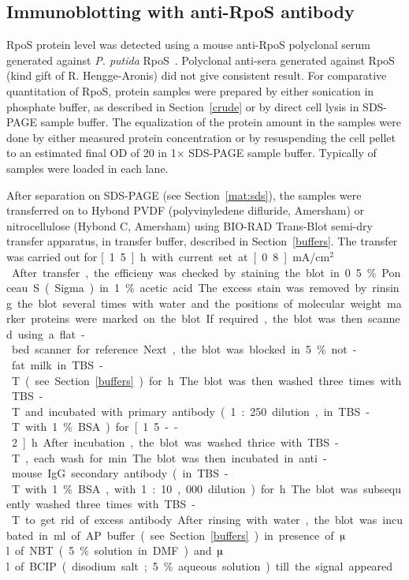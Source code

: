 \subsection{Immunoblotting with anti-RpoS antibody}
\label{mat:immunoblot} RpoS protein level was detected using a
mouse anti-RpoS polyclonal serum generated against \emph{P.
putida} RpoS~\citep[kind gift from M. Kivisaar]{Ojangu2000}.
Polyclonal anti-sera generated against  RpoS (kind gift
of R. Hengge-Aronis) did not give consistent result. For
comparative quantitation of RpoS, protein samples were prepared by
either sonication in phosphate buffer, as described in
Section~\ref{crude} or by direct cell lysis in SDS-PAGE sample
buffer. The equalization of the protein amount in the samples were
done by either measured protein concentration or by resuspending
the cell pellet to an estimated final OD of 20 in 1$\times$
SDS-PAGE sample buffer. Typically  of samples were
loaded in each lane.

After separation on SDS-PAGE (see Section~\ref{mat:sds}), the
samples were transferred on to Hybond{\tiny\texttrademark} PVDF
(polyvinyledene difluride, Amersham) or nitrocellulose
(Hybond{\tiny\texttrademark} C, Amersham) using BIO-RAD
Trans-Blot{\tiny\texttrademark} semi-dry transfer apparatus, in
transfer buffer, described in Section~\ref{buffers}. The transfer
was carried out for \unit[1.5]{h} with current set at
\unit[0.8]{mA/cm$^{2}$}. After transfer, the efficieny was checked
by staining the blot in 0.5\% Ponceau S (Sigma) in 1\% acetic
acid. The excess stain was removed by rinsing the blot several
times with water and the positions of molecular weight marker
proteins were marked on the blot. If required, the blot was then
scanned using a flat-bed scanner for reference.

Next, the blot was blocked in 5\% not-fat milk in TBS-T (see
Section \ref{buffers}) for \unit[2--12]{h}. The blot was then
washed three times with TBS-T and incubated with primary antibody
(1:250 dilution, in TBS-T with 1\% BSA) for \unit[1.5--2]{h}.
After incubation, the blot was washed thrice with TBS-T, each wash
for\unit[15]{min}. The blot was then incubated in anti-mouse IgG
secondary antibody (in TBS-T with 1\% BSA, with 1:10,000 dilution)
for \unit[1]{h}. The blot was subsequently washed three times with
TBS-T to get rid of excess antibody. After rinsing with water, the
blot was incubated in \unit[10]{ml} of AP buffer (see Section
\ref{buffers}) in presence of \unit[66]{$\muup$l} of NBT (5\%
solution in DMF) and \unit[33]{$\muup$l} of BCIP (disodium salt;
5\% aqueous solution) till the signal appeared.
